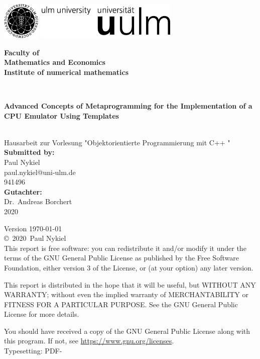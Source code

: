\documentclass[a4paper,11pt,
headsepline,           %
oneside,               %
pointlessnumbers,      %
bibtotoc,              %
DIV=15,               %
BCOR15mm               %
]{scrartcl}
\makeatletter
\newcommand{\fullname}{Paul Nykiel}
\newcommand{\email}{paul.nykiel@uni-ulm.de}
\newcommand{\titel}{Advanced Concepts of Metaprogramming for the Implementation of a CPU Emulator Using Templates}
\newcommand{\jahr}{2020}
\newcommand{\matnr}{941496}
\newcommand{\gutachter}{Dr.\, Andreas Borchert}
\newcommand{\institut}{Institute of numerical mathematics}
\makeatother
\begin{document}
\thispagestyle{empty}
\begin{addmargin*}[4mm]{-10mm}

\includegraphics[height=1.8cm]{images/unilogo_bild}
\hfill
\includegraphics[height=1.8cm]{images/unilogo_wort}\\[1em]

{\footnotesize
\hspace*{115mm}\parbox[t]{35mm}{\bfseries Faculty of \\
 Mathematics and Economics\\
\mdseries \institut}\\[2cm]

\parbox{140mm}{\bfseries \LARGE \titel}\\[2.5em]
{\footnotesize Hausarbeit zur Vorlesung "Objektorientierte Programmierung mit C++
"}\\[3em]

{\footnotesize \bfseries Submitted by:}\\
{\footnotesize \fullname\\ \email}\\ \matnr\\[2em]
{\footnotesize \bfseries Gutachter:}\\                     
{\footnotesize \gutachter}\\[2em]
{\footnotesize \jahr}
}
\end{addmargin*}


\clearpage
\thispagestyle{empty}
{ \small
  \flushleft
  Version \today \\\vfill
  \copyright~\jahr~\fullname\\[0.5em]

This report is free software: you can redistribute it and/or modify
it under the terms of the GNU General Public License as published by
the Free Software Foundation, either version 3 of the License, or
(at your option) any later version.

This report is distributed in the hope that it will be useful,
but WITHOUT ANY WARRANTY; without even the implied warranty of
MERCHANTABILITY or FITNESS FOR A PARTICULAR PURPOSE.  See the
GNU General Public License for more details.

You should have received a copy of the GNU General Public License
along with this program.  If not, see \href{https://www.gnu.org/licenses}{https://www.gnu.org/licenses}.\\

  Typesetting: PDF-\LaTeXe
}
\end{document}
